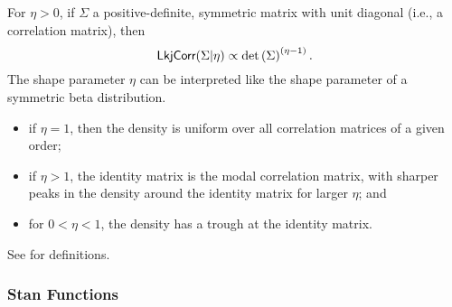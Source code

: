 For $\eta > 0$, if $\Sigma$ a positive-definite, symmetric matrix with
unit diagonal (i.e., a correlation matrix), then
%
\[
\distro{LkjCorr}(\Sigma|\eta)
\propto \det \left( \Sigma \right)^{(\eta - 1)}.
\]
%
The shape parameter $\eta$ can be interpreted like the shape parameter
of a symmetric beta distribution. 
\begin{itemize}
\item if $\eta = 1$, then the density is uniform over all correlation
  matrices of a given order;
\item if $\eta > 1$, the identity matrix is the modal correlation
  matrix, with sharper peaks in the density around the identity matrix
  for larger $\eta$; and
\item for $0 < \eta < 1$, the density has a trough at the identity
  matrix.
\end{itemize}
See \citep{LewandowskiKurowickaJoe:2009} for definitions.


\subsubsection{Stan Functions}

\begin{description}
%
%
\end{description}
\begin{description}
\end{description}





